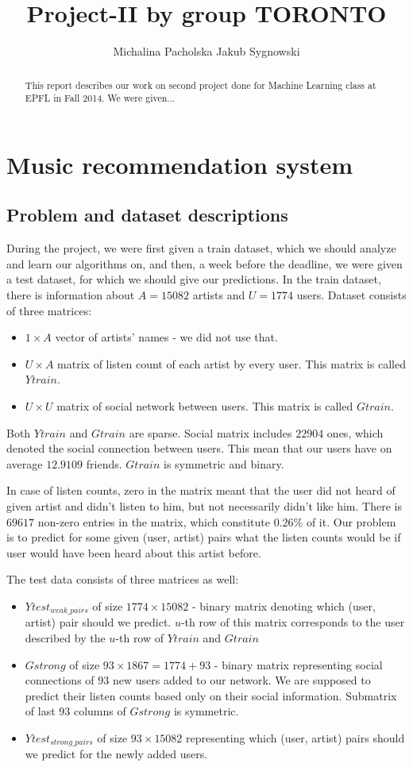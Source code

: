 \documentclass{report}
\title{Project-II by group TORONTO}
\author{Michalina Pacholska \And Jakub Sygnowski}
\newcommand{\mychapter}[2]{
    \setcounter{chapter}{#1}
    \setcounter{section}{0}
    \chapter*{#2}
}
\begin{document}
\maketitle
\begin{abstract}
This report describes our work on second project done for Machine Learning class at EPFL in Fall 2014. We were given...
\end{abstract}
\begingroup
\renewcommand{\cleardoublepage}{}
\renewcommand{\clearpage}{}
\mychapter{1}{Music recommendation system}
\endgroup
\section{Problem and dataset descriptions}
During the project, we were first given a train dataset, which we should analyze and learn our algorithms on, and then, a week before the deadline, we were given a test dataset, for which we should give our predictions. In the train dataset, there is information about $A=15082$ artists and $U=1774$ users. Dataset consists of three matrices:
\begin{itemize}
    \item $1\times A$ vector of artists' names - we did not use that.
    \item $U \times A$ matrix of listen count of each artist by every user. This matrix is called $Ytrain$.
    \item $U \times U$ matrix of social network between users. This matrix is called $Gtrain$.
\end{itemize}

Both $Ytrain$ and $Gtrain$ are sparse. Social matrix includes $22904$ ones, which denoted the social connection between users. This mean that our users have on average $12.9109$ friends. $Gtrain$ is symmetric and binary.

In case of listen counts, zero in the matrix meant that the user did not heard of given artist and didn't listen to him, but not necessarily didn't like him. There is $69617$ non-zero entries in the matrix, which constitute $0.26\%$ of it. Our problem is to predict for some given (user, artist) pairs what the listen counts would be if user would have been heard about this artist before.

The test data consists of three matrices as well:
\begin{itemize}
\item $Ytest_{weak\_pairs}$ of size $1774\times 15082$ - binary matrix denoting which (user, artist) pair should we predict. $u$-th row of this matrix corresponds to the user described by the $u$-th row of $Ytrain$ and $Gtrain$
\item $Gstrong$ of size $93 \times 1867 = 1774 + 93$ - binary matrix representing social connections of $93$ new users added to our network. We are supposed to predict their listen counts based only on their social information. Submatrix of last $93$ columns of $Gstrong$ is symmetric.
\item $Ytest_{strong\_pairs}$ of size $93 \times 15082$ representing which (user, artist) pairs should we predict for the newly added users.
\end{itemize}
\end{document}
